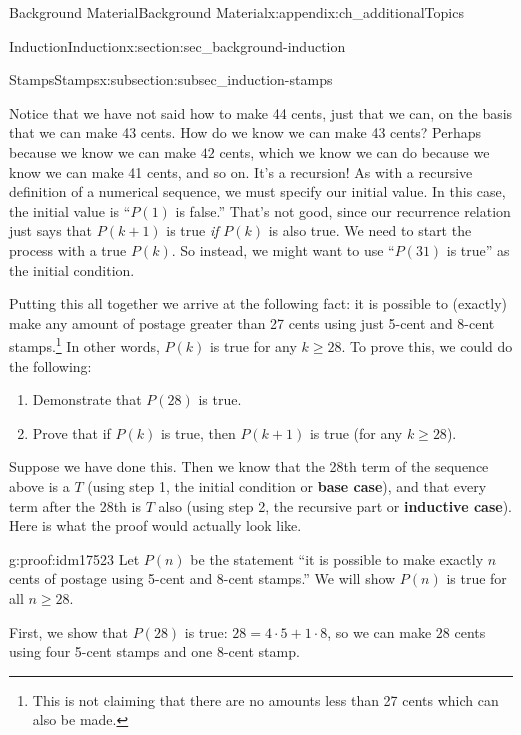\documentclass[oneside,10pt,]{book}
\newcommand{\terminology}[1]{\textbf{#1}}
\numberwithin{equation}{chapter}
\begin{document}
\begin{appendixptx}{Background Material}{}{Background Material}{}{}{x:appendix:ch_additionalTopics}
\begin{sectionptx}{Induction}{}{Induction}{}{}{x:section:sec_background-induction}
\begin{subsectionptx}{Stamps}{}{Stamps}{}{}{x:subsection:subsec_induction-stamps}
\par
Notice that we have not said how to make 44 cents, just that we can, on the basis that we can make 43 cents. How do we know we can make 43 cents? Perhaps because we know we can make \(42\)\label{g:notation:idm17494} cents, which we know we can do because we know we can make 41 cents, and so on. It's a recursion! As with a recursive definition of a numerical sequence, we must specify our initial value. In this case, the initial value is ``\(P(1)\) is false.'' That's not good, since our recurrence relation just says that \(P(k+1)\) is true \emph{if} \(P(k)\) is also true. We need to start the process with a true \(P(k)\). So instead, we might want to use ``\(P(31)\) is true'' as the initial condition.%
\par
Putting this all together we arrive at the following fact: it is possible to (exactly) make any amount of postage greater than 27 cents using just 5-cent and 8-cent stamps.\footnote{This is not claiming that there are no amounts less than 27 cents which can also be made.\label{g:fn:idm17506}} In other words, \(P(k)\) is true for any \(k \ge 28\). To prove this, we could do the following:%
\begin{enumerate}
\item{}Demonstrate that \(P(28)\) is true.%
\item{}Prove that if \(P(k)\) is true, then \(P(k+1)\) is true (for any \(k \ge 28\)).%
\end{enumerate}
%
\par
Suppose we have done this. Then we know that the 28th term of the sequence above is a \(T\) (using step 1, the initial condition or \terminology{base case}), and that every term after the 28th is \(T\) also (using step 2, the recursive part or \terminology{inductive case}). Here is what the proof would actually look like.%
\begin{proofptx}{}{g:proof:idm17523}
Let \(P(n)\) be the statement ``it is possible to make exactly \(n\) cents of postage using 5-cent and 8-cent stamps.'' We will show \(P(n)\) is true for all \(n \ge 28\).%
\par
First, we show that \(P(28)\) is true: \(28 =  4 \cdot 5+ 1\cdot 8\), so we can make \(28\) cents using four 5-cent stamps and one 8-cent stamp.%
\par

\end{proofptx}
\end{subsectionptx}
\end{sectionptx}
\end{appendixptx}
\end{document}
